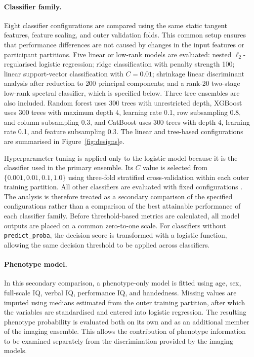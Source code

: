 \paragraph{\textbf{Classifier family.}}
\label{par:classifier-family}
Eight classifier configurations are compared using the same static tangent features, feature scaling, and outer validation folds. This common setup ensures that performance differences are not caused by changes in the input features or participant partitions. Five linear or low-rank models are evaluated: nested $\ell_2$-regularised logistic regression; ridge classification with penalty strength 100; linear support-vector classification with $C=0.01$; shrinkage linear discriminant analysis after reduction to 200 principal components; and a rank-20 two-stage low-rank spectral classifier, which is specified below. Three tree ensembles are also included. Random forest uses 300 trees with unrestricted depth, XGBoost uses 300 trees with maximum depth 4, learning rate 0.1, row subsampling 0.8, and column subsampling 0.3, and CatBoost uses 300 trees with depth 4, learning rate 0.1, and feature subsampling 0.3. The linear and tree-based configurations are summarised in Figure~\ref{fig:designs}e.

Hyperparameter tuning is applied only to the logistic model because it is the classifier used in the primary ensemble. Its $C$ value is selected from $\{0.001,0.01,0.1,1.0\}$ using three-fold stratified cross-validation within each outer training partition. All other classifiers are evaluated with fixed configurations \citep{Prokhorenkovaetal2018}. The analysis is therefore treated as a secondary comparison of the specified configurations rather than a comparison of the best attainable performance of each classifier family. Before threshold-based metrics are calculated, all model outputs are placed on a common zero-to-one scale. For classifiers without \texttt{predict\_proba}, the decision score is transformed with a logistic function, allowing the same decision threshold to be applied across classifiers.

\paragraph{\textbf{Phenotype model.}}
\label{par:phenotype-model}
In this secondary comparison, a phenotype-only model is fitted using age, sex, full-scale IQ, verbal IQ, performance IQ, and handedness. Missing values are imputed using medians estimated from the outer training partition, after which the variables are standardised and entered into logistic regression. The resulting phenotype probability is evaluated both on its own and as an additional member of the imaging ensemble. This allows the contribution of phenotype information to be examined separately from the discrimination provided by the imaging models.

